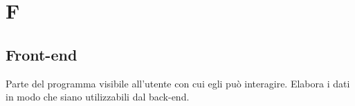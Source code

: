 \section*{F}
\markright{}
\subsection*{Front-end}
Parte del programma visibile all'utente con cui egli può interagire. Elabora i dati in modo che siano utilizzabili dal back-end.